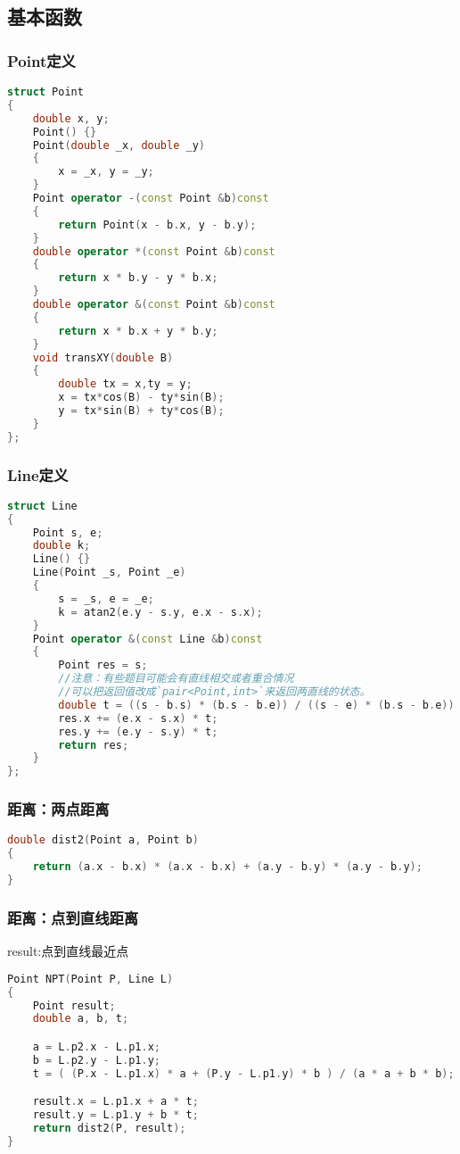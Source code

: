 \subsection{基本函数}
	\subsubsection{Point定义}
		\begin{lstlisting}[language=c++]
struct Point
{
	double x, y;
	Point() {}
	Point(double _x, double _y)
	{
		x = _x, y = _y;
	}
	Point operator -(const Point &b)const
	{
		return Point(x - b.x, y - b.y);
	}
	double operator *(const Point &b)const
	{
		return x * b.y - y * b.x;
	}
	double operator &(const Point &b)const
	{
		return x * b.x + y * b.y;
	}
	void transXY(double B)
	{
		double tx = x,ty = y;
		x = tx*cos(B) - ty*sin(B);
		y = tx*sin(B) + ty*cos(B);
	}
};
		\end{lstlisting}
		
	\subsubsection{Line定义}
		\begin{lstlisting}[language=c++]
struct Line
{
	Point s, e;
	double k;
	Line() {}
	Line(Point _s, Point _e)
	{
		s = _s, e = _e;
		k = atan2(e.y - s.y, e.x - s.x);
	}
	Point operator &(const Line &b)const
	{
		Point res = s;
		//注意：有些题目可能会有直线相交或者重合情况
		//可以把返回值改成`pair<Point,int>`来返回两直线的状态。
		double t = ((s - b.s) * (b.s - b.e)) / ((s - e) * (b.s - b.e));
		res.x += (e.x - s.x) * t;
		res.y += (e.y - s.y) * t;
		return res;
	}
};
		\end{lstlisting}
		
	\subsubsection{距离：两点距离}
		\begin{lstlisting}[language=c++]
double dist2(Point a, Point b)
{
	return (a.x - b.x) * (a.x - b.x) + (a.y - b.y) * (a.y - b.y);
}
		\end{lstlisting}
		
	\subsubsection{距离：点到直线距离}
	result:点到直线最近点
	\begin{lstlisting}[language=c++]
Point NPT(Point P, Line L)  
{ 
	Point result; 
	double a, b, t; 

	a = L.p2.x - L.p1.x; 
	b = L.p2.y - L.p1.y; 
	t = ( (P.x - L.p1.x) * a + (P.y - L.p1.y) * b ) / (a * a + b * b); 

	result.x = L.p1.x + a * t; 
	result.y = L.p1.y + b * t; 
	return dist2(P, result); 
}
	\end{lstlisting}
	
